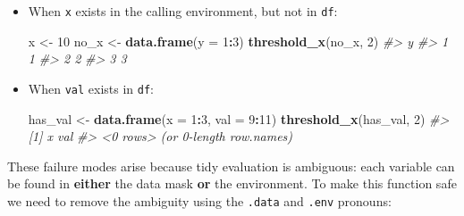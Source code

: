 \documentclass[]{book}
\newenvironment{Shaded}{\begin{snugshade}}{\end{snugshade}}
\newcommand{\CommentTok}[1]{\textcolor[rgb]{0.37,0.37,0.37}{\textit{#1}}}
\newcommand{\ControlFlowTok}[1]{\textcolor[rgb]{0.27,0.27,0.27}{\textbf{#1}}}
\newcommand{\DataTypeTok}[1]{\textcolor[rgb]{0.27,0.27,0.27}{#1}}
\newcommand{\DecValTok}[1]{\textcolor[rgb]{0.06,0.06,0.06}{#1}}
\newcommand{\KeywordTok}[1]{\textcolor[rgb]{0.27,0.27,0.27}{\textbf{#1}}}
\newcommand{\NormalTok}[1]{#1}
\newcommand{\OperatorTok}[1]{\textcolor[rgb]{0.43,0.43,0.43}{\textbf{#1}}}
\newcommand{\StringTok}[1]{\textcolor[rgb]{0.5,0.5,0.5}{#1}}
\begin{document}
\begin{itemize}
\item
  When \texttt{x} exists in the calling environment, but not in \texttt{df}:

\begin{Shaded}
\begin{Highlighting}[]
\NormalTok{x <-}\StringTok{ }\DecValTok{10}
\NormalTok{no_x <-}\StringTok{ }\KeywordTok{data.frame}\NormalTok{(}\DataTypeTok{y =} \DecValTok{1}\OperatorTok{:}\DecValTok{3}\NormalTok{)}
\KeywordTok{threshold_x}\NormalTok{(no_x, }\DecValTok{2}\NormalTok{)}
\CommentTok{#>   y}
\CommentTok{#> 1 1}
\CommentTok{#> 2 2}
\CommentTok{#> 3 3}
\end{Highlighting}
\end{Shaded}
\item
  When \texttt{val} exists in \texttt{df}:

\begin{Shaded}
\begin{Highlighting}[]
\NormalTok{has_val <-}\StringTok{ }\KeywordTok{data.frame}\NormalTok{(}\DataTypeTok{x =} \DecValTok{1}\OperatorTok{:}\DecValTok{3}\NormalTok{, }\DataTypeTok{val =} \DecValTok{9}\OperatorTok{:}\DecValTok{11}\NormalTok{)}
\KeywordTok{threshold_x}\NormalTok{(has_val, }\DecValTok{2}\NormalTok{)}
\CommentTok{#> [1] x   val}
\CommentTok{#> <0 rows> (or 0-length row.names)}
\end{Highlighting}
\end{Shaded}
\end{itemize}

These failure modes arise because tidy evaluation is ambiguous: each variable can be found in \textbf{either} the data mask \textbf{or} the environment. To make this function safe we need to remove the ambiguity using the \texttt{.data} and \texttt{.env} pronouns:

\begin{Shaded}
\end{Shaded}
\end{document}
